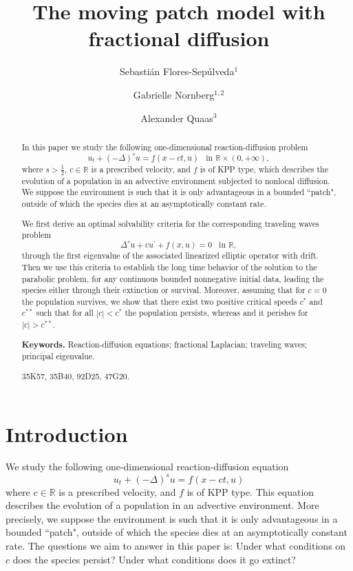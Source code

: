 \documentclass[11pt,a4paper]{amsart}
\title{The moving patch model with fractional diffusion}
\author{Sebastián Flores-Sepúlveda$^{1}$}
\author{Gabrielle Nornberg$^{1,2}$}
\author{Alexander Quaas$^3$}
\newcommand{\R}{\mathbb{R}}
\begin{document}
\begin{abstract}
In this paper we study the following one-dimensional reaction-diffusion problem
$$
u_t+(-\Delta)^s u=f(x-c t, u) \;\:\textrm{ in } \mathbb{R}\times (0,+\infty),
$$
where $s>\frac{1}{2}$, $c \in \mathbb{R}$ is a prescribed velocity, and $f$ is of KPP type, which describes the evolution of a population in an advective environment subjected to nonlocal diffusion. We suppose the environment is such that it is only advantageous in a bounded ``patch", outside of which the species dies at an asymptotically constant rate. 

We first derive an optimal solvability criteria for the corresponding traveling waves problem 
$$\Delta^s u+c u^{\prime}+f(x, u)=0 \;\:\textrm{ in } \mathbb{R},$$ through the first eigenvalue of the associated linearized elliptic operator with drift. Then we use this criteria to establish the long time  behavior of the solution to the parabolic problem, for any continuous bounded nonnegative initial data, leading the species either through their extinction or survival. 
Moreover, assuming that for $c=0$ the population survives, we show that there exist two positive critical speeds $c^{*}$ and $c^{**}$ such that for all $|c| <c^{*}$ the population persists, whereas and it perishes for $|c| >c^{**}$.

	\smallskip
\noindent \textbf{Keywords.} {Reaction-diffusion equations; fractional Laplacian; traveling waves; principal eigenvalue.}

 {35K57, 35B40, 92D25, 47G20.}

\end{abstract}

\maketitle

\section{Introduction}

We study the following one-dimensional reaction-diffusion equation
\[u_t + (-\Delta)^su = f(x-ct,u)\]
where $c \in \R$ is a prescribed velocity, and $f$ is of KPP type. This equation describes the evolution of a population in an advective environment. More precisely, we suppose the environment is such that it is only advantageous in a bounded ``patch", outside of which the species dies at an asymptotically constant rate. The questions we aim to answer in this paper is: Under what conditions on $c$ does the species persist? Under what conditions does it go extinct?
\end{document}
